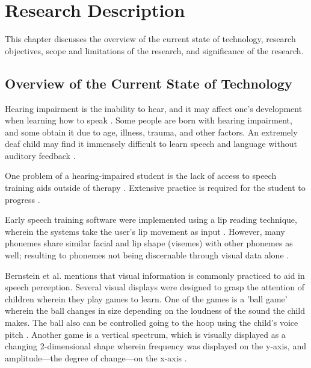 \chapter{Research Description}
\label{sec:researchdesc}

This chapter discusses the overview of the current state of technology, research objectives, scope and limitations of the research, and significance of the research.

\section{Overview of the Current State of Technology}
\label{sec:overview}

Hearing impairment is the inability to hear, and it may affect one's development when learning how to speak \cite{lasak:2014:HL}. Some people are born with hearing impairment, and some obtain it due to age, illness, trauma, and other factors. An extremely deaf child may find it immensely difficult to learn speech and language without auditory feedback \cite{bernstein:1988:STA}.

\begin{comment}
Throughout the years, man has tried to find ways to help the hearing-handicapped learn how to speak properly \cite{oyer:1976:CHH}. Oyer \citeyear{oyer:1976:CHH} states that there was a time when hearing-handicapped were considered unfit to hold citizenship. James Pickett, a professor of speech communication research says "I believe that large improvements in the lives of deaf persons depends on making large improvements in their speech communication" \cite{connor:1971:SDC}. Pickett also states that in the late 19th century, research began for helping the Deaf communicate \cite{connor:1971:SDC}.
\end{comment}

One problem of a hearing-impaired student is the lack of access to speech training aids outside of therapy \cite{bernstein:1988:STA}. Extensive practice is required for the student to progress \cite{bernstein:1988:STA}.

Early speech training software were implemented using a lip reading technique, wherein the systems take the user's lip movement as input \cite{heracleous:2010:CSA}. However, many phonemes share similar facial and lip shape (visemes) with other phonemes as well; resulting to phonemes not being discernable through visual data alone \cite{heracleous:2010:CSA}.

Bernstein et al. \citeyear{bernstein:1988:STA} mentions that visual information is commonly practiced to aid in speech perception. Several visual displays were designed to grasp the attention of children wherein they play games to learn. One of the games is a 'ball game' wherein the ball changes in size depending on the loudness of the sound the child makes. The ball also can be controlled going to the hoop using the child's voice pitch \cite{bernstein:1988:STA}. Another game is a vertical spectrum, which is visually displayed as a changing 2-dimensional shape wherein frequency was displayed on the y-axis, and amplitude—the degree of change—on the x-axis \cite{bernstein:1988:STA}.

